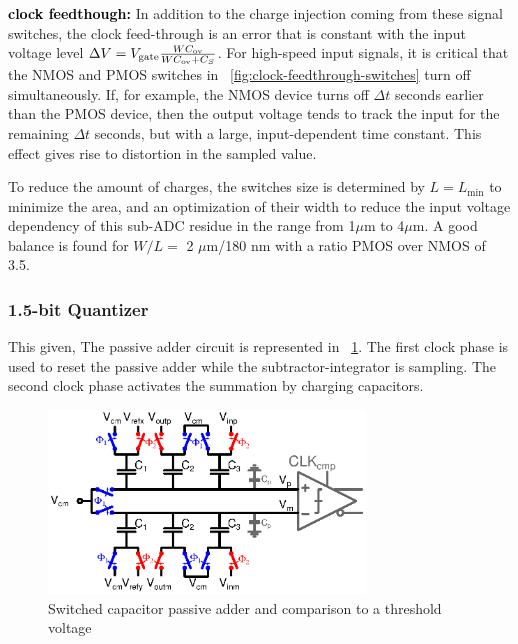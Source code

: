 \textbf{\textcolor{black}{clock feedthough:}}
In addition to the charge injection coming from these signal switches, the clock feed-through is an error that is constant with the input voltage level \(\Delta V = V_{\rm gate} \frac{W C_{\rm ov}}{W C_{\rm ov}+C_S}\). For high-speed input signals, it is critical that the NMOS and PMOS switches in \figurename~\ref{fig:clock-feedthrough-switches} turn off simultaneously. If, for example, the NMOS device turns off \(\Delta t\) seconds earlier than the PMOS device, then the output voltage tends to track the input for the remaining \(\Delta t\) seconds, but with a large, input-dependent time constant. This effect gives rise to distortion in the sampled value.

To reduce the amount of charges, the switches size is determined by \(L=L_{\min}\) to minimize the area, and an optimization of their width to reduce the input voltage dependency of this sub-ADC residue in the range from 1\(\mu \)m to 4\(\mu \)m. A good balance is found for \(W/L = \) 2 \(\mu \)m/180 nm with a ratio PMOS over NMOS of 3.5.


	\subsubsection{1.5-bit Quantizer}             %
	\label{sec:isd-3-levels-quantizer}
This given, The passive adder circuit is represented in \figurename~\ref{fig:sc-pacth}. The first clock phase is used to reset the passive adder while the subtractor-integrator is sampling. The second clock phase activates the summation by charging capacitors.

\begin{figure}[htp]
	\centering
	\includegraphics[width=0.75\textwidth]{Chapter4/Figs/isd-passive-adder-comp.ps}
	\caption{Switched capacitor passive adder and comparison to a threshold voltage}
	\label{fig:sc-pacth}
\end{figure}

